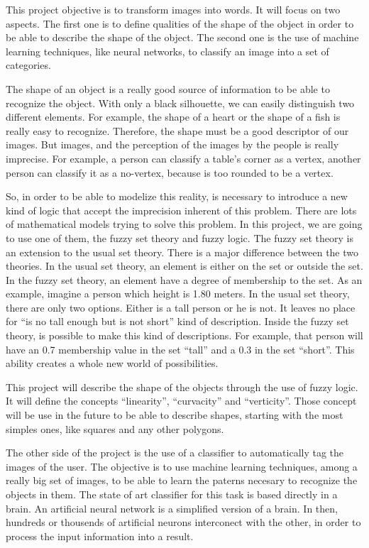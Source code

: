 This project objective is to transform images into words. It will focus on two aspects. The first one is to define qualities of the shape of the object in order to be able to describe the shape of the object. The second one is the use of machine learning techniques, like neural networks, to classify an image into a set of categories.

The shape of an object is a really good source of information to be able to recognize the object. With only a black silhouette, we can easily distinguish two different elements. For example, the shape of a heart or the shape of a fish is really easy to recognize. Therefore, the shape must be a good descriptor of our images. But images, and the perception of the images by the people is really imprecise. For example, a person can classify a table’s corner as a vertex, another person can classify it as a no-vertex, because is too rounded to be a vertex.

So, in order to be able to modelize this reality, is necessary to introduce a new kind of logic that accept the imprecision inherent of this problem. There are lots of mathematical models trying to solve this problem. In this project, we are going to use one of them, the fuzzy set theory and fuzzy logic. The fuzzy set theory is an extension to the usual set theory. There is a major difference between the two theories. In the usual set theory, an element is either on the set or outside the set. In the fuzzy set theory, an element have a degree of membership to the set. As an example, imagine a person which height is 1.80 meters. In the usual set theory, there are only two options. Either is a tall person or he is not. It leaves no place for “is no tall enough but is not short” kind of description. Inside the fuzzy set theory, is possible to make this kind of descriptions. For example, that person will have an 0.7 membership value in the set “tall” and a 0.3 in the set “short”. This ability creates a whole new world of possibilities.

This project will describe the shape of the objects through the use of fuzzy logic. It will define the concepts “linearity”, “curvacity” and “verticity”. Those concept will be use in the future to be able to describe shapes, starting with the most simples ones, like squares and any other polygons.

The other side of the project is the use of a classifier to automatically tag the images of the user. The objective is to use machine learning techniques, among a really big set of images, to be able to learn the paterns necesary to recognize the objects in them. The state of art classifier for this task is based directly in a brain. An artificial neural network is a simplified version of a brain. In then, hundreds or thousends of artificial neurons interconect with the other, in order to process the input information into a result.

